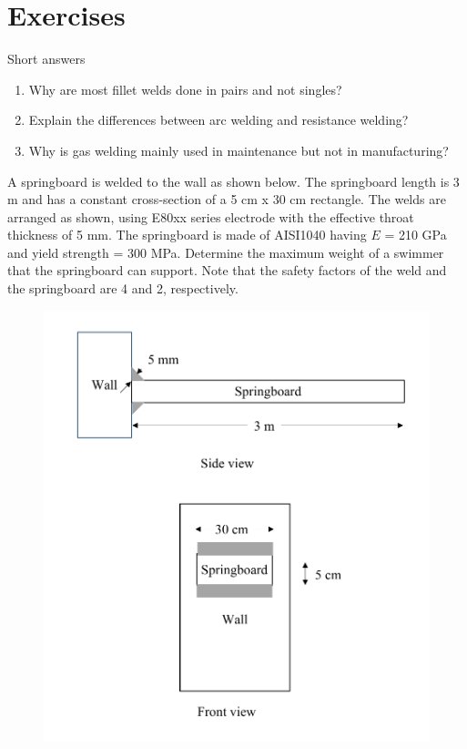 \documentclass[
10pt,
a4paper,
openany,
svgnames,
]{book}
\newcommand{\exercise}{%
\item \label{lab:\arabic{chapter}.\arabic{exercisesi}}  %
}
\begin{document}
\section*{Exercises}

\begin{exercises}
  \exercise Short answers
  \begin{enumerate}
  \item Why are most fillet welds done in pairs and not singles?
  \item Explain the differences between arc welding and resistance welding?
  \item Why is gas welding mainly used in maintenance but not in manufacturing?
  \end{enumerate}
  \exercise A springboard is welded to the wall as shown below. The springboard length is 3 m and has a constant cross-section of a 5 cm x 30 cm rectangle. The welds are arranged as shown, using E80xx series electrode with the effective throat thickness of 5 mm. The springboard is made of AISI1040 having $E$ = 210 GPa and yield strength = 300 MPa. Determine the maximum weight of a swimmer that the springboard can support. Note that the safety factors of the weld and the springboard are 4 and 2, respectively.
  \begin{figure}[H]
    \centering
    \includegraphics[scale=0.7]{pictures/Welding/springboard-exercise}

\end{figure}
\end{exercises}
\end{document}
